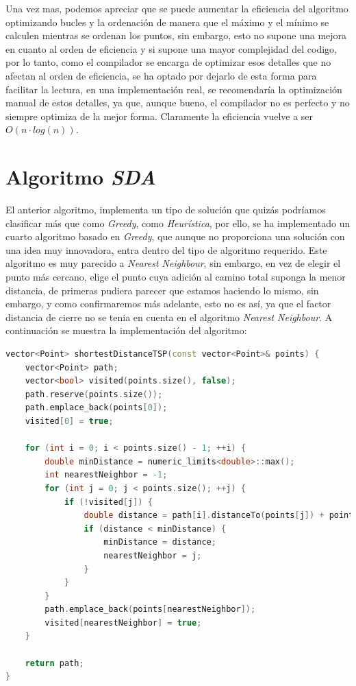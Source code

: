 \documentclass[11pt,openany]{book}
\begin{document}
Una vez mas, podemos apreciar que se puede aumentar la eficiencia del algoritmo
optimizando bucles y la ordenación de manera que el máximo y el mínimo se calculen
mientras se ordenan los puntos, sin embargo, esto no supone una mejora en cuanto
al orden de eficiencia y si supone una mayor complejidad del codigo, por lo tanto,
como el compilador se encarga de optimizar esos detalles que no afectan al orden
de eficiencia, se ha optado por dejarlo de esta forma para facilitar la lectura, 
en una implementación real, se recomendaría la optimización manual de estos detalles, ya que,
aunque bueno, el compilador no es perfecto y no siempre optimiza de la mejor forma.
Claramente la eficiencia vuelve a ser $O(n \cdot log(n))$.

\section{Algoritmo \textit{SDA}}
El anterior algoritmo, implementa un tipo de solución que quizás podríamos clasificar
más que como \textit{Greedy}, como \textit{Heurística}, por ello, se ha implementado 
un cuarto algoritmo basado en \textit{Greedy}, que aunque no proporciona una solución 
con una idea muy innovadora, entra dentro del tipo de algoritmo requerido. Este algoritmo
es muy parecido a \textit{Nearest Neighbour}, sin embargo, en vez de elegir el punto más
cercano, elige el punto cuya adición al camino total suponga la menor distancia, de primeras
pudiera parecer que estamos haciendo lo mismo, sin embargo, y como confirmaremos más adelante,
esto no es así, ya que el factor distancia de cierre no se tenia en cuenta en el algoritmo
\textit{Nearest Neighbour}. A continuación se muestra la implementación del algoritmo:
\begin{lstlisting}[language=C++]
vector<Point> shortestDistanceTSP(const vector<Point>& points) {
    vector<Point> path;
    vector<bool> visited(points.size(), false);
    path.reserve(points.size());
    path.emplace_back(points[0]);
    visited[0] = true;

    for (int i = 0; i < points.size() - 1; ++i) {
        double minDistance = numeric_limits<double>::max();
        int nearestNeighbor = -1;
        for (int j = 0; j < points.size(); ++j) {
            if (!visited[j]) {
                double distance = path[i].distanceTo(points[j]) + points[j].distanceTo(points[0]);
                if (distance < minDistance) {
                    minDistance = distance;
                    nearestNeighbor = j;
                }
            }
        }
        path.emplace_back(points[nearestNeighbor]);
        visited[nearestNeighbor] = true;
    }

    return path;
}
\end{lstlisting}
\end{document}
